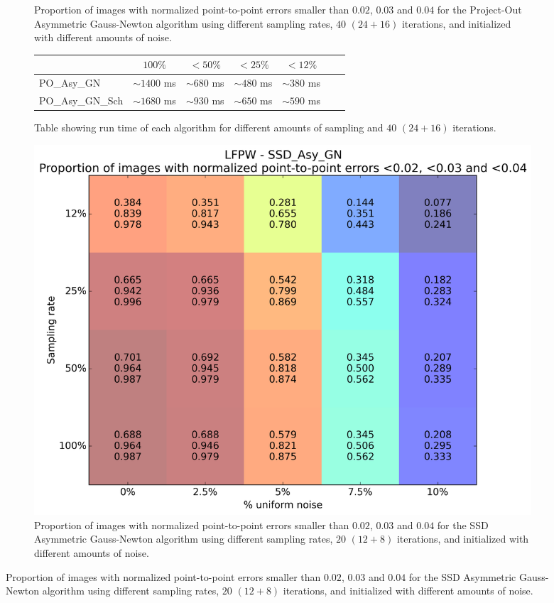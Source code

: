 \begin{figure}[p]
\begin{subfigure}{0.48\textwidth}
	    \caption{Proportion of images with normalized point-to-point errors smaller than $0.02$, $0.03$ and $0.04$ for the Project-Out Asymmetric Gauss-Newton algorithm using different sampling rates, $40$ $(24 + 16)$ iterations, and initialized with different amounts of noise.}
	    \label{fig:sampling_vs_noise_po_asy_gn}
	\end{subfigure}
	\par\bigskip\bigskip
	\begin{subfigure}{\textwidth}
		\center
		\begin{tabular}{lcccccc}
		    \toprule
		    & $100\%$ & $<50\%$ & $<25\%$ & $<12\%$ 
		    \\
		    \midrule
		    PO\_Asy\_GN & $\sim1400$ ms & $\sim680$ ms & $\sim480$ ms & $\sim380$ ms
		    \\ 
		    PO\_Asy\_GN\_Sch & $\sim1680$ ms & $\sim930$ ms & $\sim650$ ms & $\sim590$ ms
		    \\
		    \bottomrule
	  	\end{tabular}
	  	\caption{Table showing run time of each algorithm for different amounts of sampling and $40$ $(24 + 16)$ iterations.}
	    \label{tab:runtime_40}
	\end{subfigure}
	\par\bigskip\bigskip
	\begin{subfigure}{0.48\textwidth}
	    \includegraphics[width=\textwidth]{experiments/sampling/sampling_vs_noise_ssd_asy_gn_20.png}
	    \caption{Proportion of images with normalized point-to-point errors smaller than $0.02$, $0.03$ and $0.04$ for the SSD Asymmetric Gauss-Newton algorithm using different sampling rates, $20$ $(12 + 8)$ iterations, and initialized with different amounts of noise.}

\end{subfigure}
\end{figure}
